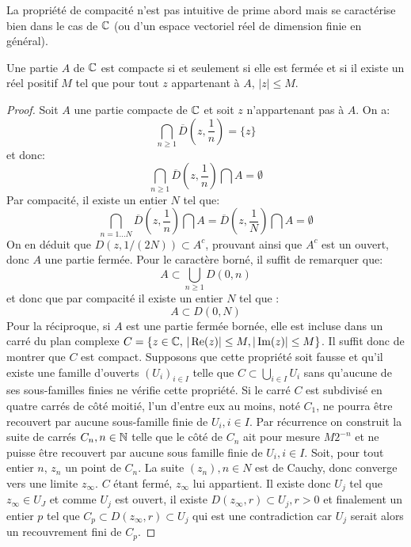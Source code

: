La propriété de compacité n'est pas intuitive de prime abord mais se caractérise bien dans le cas de $\mathbb{C}$ (ou d'un espace vectoriel réel de dimension finie en général). 
\begin{fprop}
Une partie $A$ de $\mathbb{C}$ est compacte si et seulement si elle est fermée et si il existe un réel positif $M$ tel que pour tout $z$ appartenant à $A$, $|z| \leq M$.
\end{fprop}
\begin{proof}
Soit $A$ une partie compacte de $\mathbb{C}$ et soit $z$ n'appartenant pas à $A$. On a:
\[
\bigcap_{n \geq 1} \overline{D}\left(z, \frac{1}{n}\right) = \{z\}
\]
et donc:
\[
\bigcap_{n \geq 1} \overline{D}\left(z, \frac{1}{n}\right) \bigcap A = \emptyset
\]
Par compacité, il existe un entier $N$ tel que:
\[
\bigcap_{n =1 \dots N} \overline{D}\left(z, \frac{1}{n}\right) \bigcap A = \overline{D}\left(z, \frac{1}{N}\right) \bigcap A =\emptyset
\]
On en déduit que $D(z,1/(2N)) \subset A^c$, prouvant ainsi que $A^c$ est un ouvert, donc $A$ une partie fermée. Pour le caractère borné, il suffit de remarquer que:
\[
A \subset \bigcup_{n \geq 1} D(0,n)
\]
et donc que par compacité il existe un entier $N$ tel que :
\[
A \subset D(0,N)
\]
Pour la réciproque, si $A$ est une partie fermée bornée, elle est incluse dans un carré du plan complexe $C = \{ z \in \mathbb{C}, \, |\operatorname{Re}(z)| \leq M, | \operatorname{Im}(z)| \leq M \}$. Il suffit donc de montrer que $C$ est compact. Supposons que cette propriété soit fausse et qu'il existe une famille d'ouverts $(U_i)_{i \in I}$ telle que $C \subset \bigcup_{i \in I} U_i$ sans qu'aucune de ses sous-familles finies ne vérifie cette propriété. Si le carré $C$ est subdivisé en quatre carrés de côté moitié, l'un d'entre eux au moins, noté $C_1$, ne pourra être recouvert par aucune sous-famille finie de $U_i, i \in I$. Par récurrence on construit la suite de carrés $C_n, n \in {\mathbb N}$ telle que le côté de $C_n$ ait pour mesure $M 2^{-n}$ et ne puisse être recouvert par aucune sous famille finie de $U_i, i \in I$. Soit, pour tout entier $n$, $z_n$ un point de $C_n$. La suite $(z_n), n \in N$ est de Cauchy, donc converge vers une limite $z_\infty$. $C$ étant fermé, $z_\infty$ lui appartient. Il existe donc $U_j$ tel que $z_\infty \in U_J$ et comme $U_j$ est ouvert, il existe $D(z_\infty,r) \subset U_j, r > 0$ et finalement un entier $p$ tel que $C_p \subset D(z_\infty,r) \subset U_j$ qui est une contradiction car $U_j$ serait alors un recouvrement fini de $C_p$.
\end{proof}

